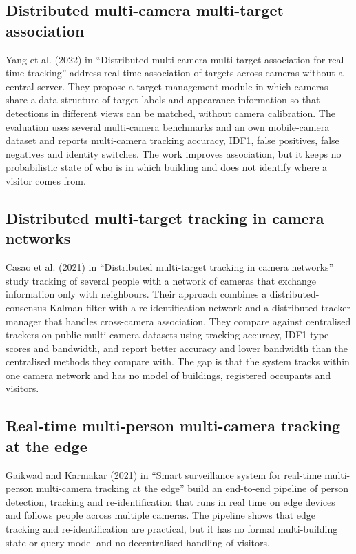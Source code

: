 \documentclass[12pt,a4paper,oneside]{report}
\begin{document}
\clearpage
\subsection{Distributed multi-camera multi-target association}
Yang et al. (2022) in ``Distributed multi-camera multi-target association for real-time tracking'' \cite{ref3} address real-time association of targets across cameras without a central server. They propose a target-management module in which cameras share a data structure of target labels and appearance information so that detections in different views can be matched, without camera calibration. The evaluation uses several multi-camera benchmarks and an own mobile-camera dataset and reports multi-camera tracking accuracy, IDF1, false positives, false negatives and identity switches. The work improves association, but it keeps no probabilistic state of who is in which building and does not identify where a visitor comes from.

\subsection{Distributed multi-target tracking in camera networks}
Casao et al. (2021) in ``Distributed multi-target tracking in camera networks'' \cite{ref4} study tracking of several people with a network of cameras that exchange information only with neighbours. Their approach combines a distributed-consensus Kalman filter with a re-identification network and a distributed tracker manager that handles cross-camera association. They compare against centralised trackers on public multi-camera datasets using tracking accuracy, IDF1-type scores and bandwidth, and report better accuracy and lower bandwidth than the centralised methods they compare with. The gap is that the system tracks within one camera network and has no model of buildings, registered occupants and visitors.

\clearpage
\subsection{Real-time multi-person multi-camera tracking at the edge}
Gaikwad and Karmakar (2021) in ``Smart surveillance system for real-time multi-person multi-camera tracking at the edge'' \cite{ref5} build an end-to-end pipeline of person detection, tracking and re-identification that runs in real time on edge devices and follows people across multiple cameras. The pipeline shows that edge tracking and re-identification are practical, but it has no formal multi-building state or query model and no decentralised handling of visitors.
\end{document}
